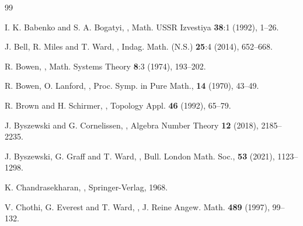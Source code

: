 \documentclass[oneside]{amsart}
\begin{document}
\vspace{1cm}
\begin{thebibliography}{99}


{\sc I. K. Babenko and S. A. Bogatyi},
,
\newblock Math. USSR Izvestiya {\bf 38}:1 (1992), 1--26.

{\sc J. Bell, R. Miles and T. Ward},
,
\newblock Indag. Math. (N.S.) \textbf{25}:4 (2014), 652--668.

{\sc R. Bowen},
,
\newblock Math. Systems Theory \textbf{8}:3 (1974), 193--202.

{\sc R. Bowen, O. Lanford},
,
\newblock  Proc. Symp. in Pure Math.,  \textbf{14} (1970), 43--49.

{\sc R. Brown and H. Schirmer},
,
\newblock  Topology Appl.  \textbf{46} (1992), 65--79.

{\sc J. Byszewski and G. Cornelissen},
,
\newblock Algebra Number Theory \textbf{12} (2018), 2185--2235.

{\sc J. Byszewski, G. Graff and T. Ward},
,
\newblock Bull. London Math. Soc., {\bf 53} (2021), 1123--1298.



{\sc K. Chandrasekharan},
,
\newblock Springer-Verlag, 1968.

{\sc V. Chothi, G. Everest and T. Ward},
,
\newblock J. Reine Angew. Math. \textbf{489} (1997), 99--132.


\end{thebibliography}
\end{document}
